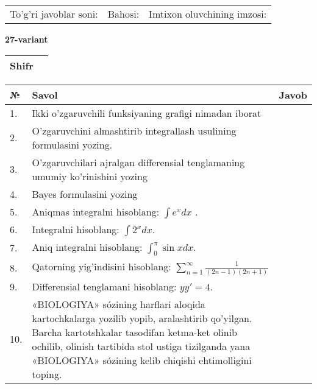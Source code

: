 \documentclass{article}
\begin{document}
  \vspace{1cm}
  
  \begin{tabular}{lll}
  To'g'ri javoblar soni: \underline{\hspace{1.5cm}} & 
  Bahosi: \underline{\hspace{1.5cm}} & 
  Imtixon oluvchining imzosi: \underline{\hspace{2cm}} \\
  \end{tabular}
  
  \egroup
  
  \newpage
  
  
  \textbf{27-variant}\\
  
  \bgroup
  \def\arraystretch{1.6} %
  
  \begin{tabular}{|m{5.7cm}|m{9.5cm}|}
  \hline
  Shifr & \\
  \hline
  \end{tabular}
  
  \vspace{1cm}
  
  \begin{tabular}{|m{0.7cm}|m{10cm}|m{4cm}|}
  \hline
  № & Savol & Javob \\
  \hline
  1. & Ikki o'zgaruvchili funksiyaning grafigi nimadan iborat &  \\
  \hline
  2. & O'zgaruvchini almashtirib integrallash usulining formulasini yozing. &  \\
  \hline
  3. & O'zgaruvchilari ajralgan differensial tenglamaning umumiy ko'rinishini yozing &  \\
  \hline
  4. & Bayes formulasini yozing &  \\
  \hline
  5. & Aniqmas integralni hisoblang: \(\int {e^{x}dx}\) . &  \\
  \hline
  6. & Integralni hisoblang: \(\int {2^{x}dx}\). &  \\
  \hline
  7. & Aniq integralni hisoblang: \(\int_{0}^{\pi}{\sin xdx}\). &  \\
  \hline
  8. & Qatorning yig'indisini hisoblang: \(\sum_{n = 1}^{\infty}\frac{1}{(2n - 1)(2n + 1)}\) &  \\
  \hline
  9. & Differensial tenglamani hisoblang: \(yy' = 4\). &  \\
  \hline
  10. & «BIOLOGIYA» sózining harflari aloqida kartochkalarga yozilib yopib, aralashtirib qo'yilgan. Barcha kartotshkalar tasodifan ketma-ket olinib ochilib, olinish tartibida stol ustiga tizilganda yana «BIOLOGIYA» sózining kelib chiqishi ehtimolligini toping. &  \\
  \hline
  \end{tabular}
  
\end{document}
